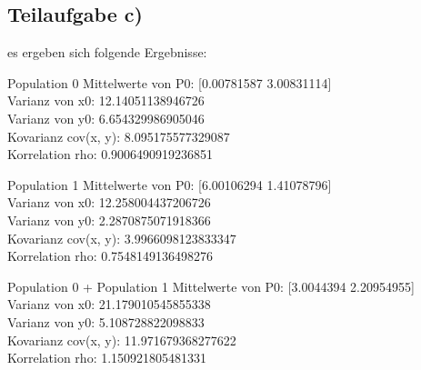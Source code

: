\subsection{Teilaufgabe c)}
es ergeben sich folgende Ergebnisse:
\begin{console1}{Population 0}
  Mittelwerte von P0:  [0.00781587 3.00831114] \\
  Varianz von x0:  12.14051138946726 \\
  Varianz von y0:  6.654329986905046 \\
  Kovarianz cov(x, y):  8.095175577329087 \\
  Korrelation rho:  0.9006490919236851
\end{console1}

\begin{console1}{Population 1}
  Mittelwerte von P0:  [6.00106294 1.41078796] \\
  Varianz von x0:  12.258004437206726 \\
  Varianz von y0:  2.2870875071918366 \\
  Kovarianz cov(x, y):  3.9966098123833347 \\
  Korrelation rho:  0.7548149136498276
\end{console1}

\begin{console1}{Population 0 + Population 1}
  Mittelwerte von P0:  [3.0044394  2.20954955] \\
  Varianz von x0:  21.179010545855338 \\
  Varianz von y0:  5.108728822098833 \\
  Kovarianz cov(x, y):  11.971679368277622 \\
  Korrelation rho:  1.150921805481331
\end{console1}
